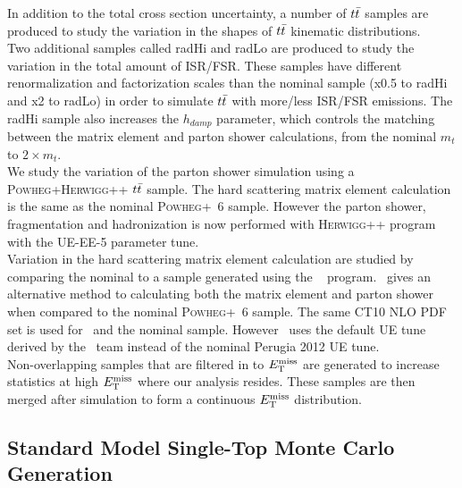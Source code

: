 \indent In addition to the total cross section uncertainty, a number of $t\bar{t}$ samples are produced to study the variation in the shapes of $t\bar{t}$ kinematic distributions. \\
\indent  Two additional samples called radHi and radLo are produced to study the variation in the total amount of ISR/FSR.  These samples have different renormalization and factorization scales than the nominal sample (x0.5 to radHi and x2 to radLo) in order to simulate $t\bar{t}$ with more/less ISR/FSR emissions. The radHi sample also increases the $h_{damp}$ parameter, which controls the matching between the matrix element and parton shower calculations, from the nominal $m_{t}$ to $2 \times m_{t}$. \\

\indent We study the variation of the parton shower simulation using a \textsc{Powheg+Herwigg++} $t\bar{t}$ sample. The hard scattering matrix element calculation is the same as the nominal \textsc{Powheg+\pythia~6} sample.  However the parton shower, fragmentation and hadronization is now performed with \textsc{Herwigg++} program with the UE-EE-5 parameter tune.\cite{Herwigg,CTEQ6L1}  \\%

\indent Variation in the hard scattering matrix element calculation are studied by comparing the nominal to a sample generated using the \sherpa~\cite{sherpa} program.  \sherpa~gives an alternative method to calculating both the matrix element and parton shower when compared to the nominal \textsc{Powheg+\pythia~6} sample.  The same CT10 NLO PDF set is used for \sherpa~and the nominal sample.  However \sherpa~uses the default UE tune derived by the \sherpa~team instead of the nominal Perugia 2012 UE tune. \\ 

\indent Non-overlapping samples that are filtered in to $E_{\mathrm{T}}^{\mathrm{miss}}$ are generated to increase statistics at high $E_{\mathrm{T}}^{\mathrm{miss}}$ where our analysis resides.  These samples are then merged after simulation to form a  continuous $E_{\mathrm{T}}^{\mathrm{miss}}$ distribution. \\

\subsection{Standard Model Single-Top Monte Carlo Generation}


